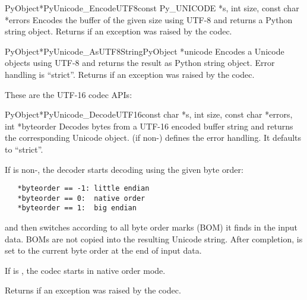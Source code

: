 \begin{cfuncdesc}{PyObject*}{PyUnicode_EncodeUTF8}{const Py_UNICODE *s,
                                               int size,
                                               const char *errors}
  Encodes the  buffer of the given size using UTF-8
  and returns a Python string object.  Returns \NULL{} if an exception
  was raised by the codec.
\end{cfuncdesc}

\begin{cfuncdesc}{PyObject*}{PyUnicode_AsUTF8String}{PyObject *unicode}
  Encodes a Unicode objects using UTF-8 and returns the result as
  Python string object.  Error handling is ``strict''.  Returns
  \NULL{} if an exception was raised by the codec.
\end{cfuncdesc}


These are the UTF-16 codec APIs:

\begin{cfuncdesc}{PyObject*}{PyUnicode_DecodeUTF16}{const char *s,
                                               int size,
                                               const char *errors,
                                               int *byteorder}
  Decodes  bytes from a UTF-16 encoded buffer string and
  returns the corresponding Unicode object.   (if
  non-\NULL) defines the error handling. It defaults to ``strict''.

  If  is non-\NULL, the decoder starts decoding using
  the given byte order:

\begin{verbatim}
   *byteorder == -1: little endian
   *byteorder == 0:  native order
   *byteorder == 1:  big endian
\end{verbatim}

  and then switches according to all byte order marks (BOM) it finds
  in the input data.  BOMs are not copied into the resulting Unicode
  string.  After completion,  is set to the current
  byte order at the end of input data.

  If  is \NULL, the codec starts in native order mode.

  Returns \NULL{} if an exception was raised by the codec.
\end{cfuncdesc}

